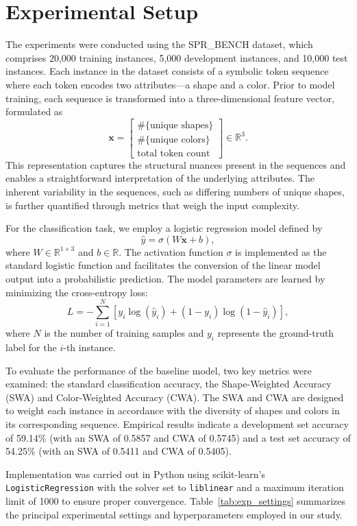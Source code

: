 \documentclass{article}
\begin{document}
\section{Experimental Setup}
The experiments were conducted using the SPR\_BENCH dataset, which comprises 20,000 training instances, 5,000 development instances, and 10,000 test instances. Each instance in the dataset consists of a symbolic token sequence where each token encodes two attributes—a shape and a color. Prior to model training, each sequence is transformed into a three-dimensional feature vector, formulated as 
\[
\mathbf{x} = \begin{bmatrix} \#\{\text{unique shapes}\} \\ \#\{\text{unique colors}\} \\ \text{total token count} \end{bmatrix} \in \mathbb{R}^3.
\]
This representation captures the structural nuances present in the sequences and enables a straightforward interpretation of the underlying attributes. The inherent variability in the sequences, such as differing numbers of unique shapes, is further quantified through metrics that weigh the input complexity.

For the classification task, we employ a logistic regression model defined by
\[
\hat{y} = \sigma(W\mathbf{x} + b),
\]
where \(W \in \mathbb{R}^{1 \times 3}\) and \(b \in \mathbb{R}\). The activation function \(\sigma\) is implemented as the standard logistic function and facilitates the conversion of the linear model output into a probabilistic prediction. The model parameters are learned by minimizing the cross-entropy loss:
\[
L = -\sum_{i=1}^{N} \left[y_i \log(\hat{y}_i) + (1-y_i)\log\left(1-\hat{y}_i\right)\right],
\]
where \(N\) is the number of training samples and \(y_i\) represents the ground-truth label for the \(i\)-th instance.

To evaluate the performance of the baseline model, two key metrics were examined: the standard classification accuracy, the Shape-Weighted Accuracy (SWA) and Color-Weighted Accuracy (CWA). The SWA and CWA are designed to weight each instance in accordance with the diversity of shapes and colors in its corresponding sequence. Empirical results indicate a development set accuracy of 59.14\% (with an SWA of 0.5857 and CWA of 0.5745) and a test set accuracy of 54.25\% (with an SWA of 0.5411 and CWA of 0.5405).

Implementation was carried out in Python using scikit-learn's \texttt{LogisticRegression} with the solver set to \texttt{liblinear} and a maximum iteration limit of 1000 to ensure proper convergence. Table~\ref{tab:exp_settings} summarizes the principal experimental settings and hyperparameters employed in our study.
\end{document}
